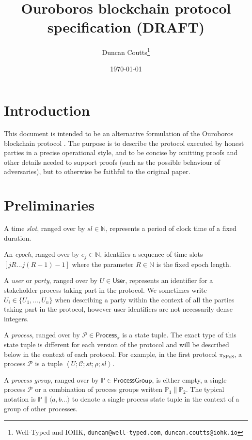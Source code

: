 \documentclass{article}
\newcommand{\sPar}{\mathrel{\parallel}}
\newcommand{\sProcess}[4]{\left\langle U ; #1 ; #2 ; #3 ; #4 \right\rangle}
\newcommand{\sChain}{\mathcal{C}}
\newcommand{\sState}{\mathit{st}}
\newcommand{\sSlot}{\mathit{sl}}
\newcommand{\sProcesses}{\mathbb{P}}
\begin{document}
\title{Ouroboros blockchain protocol specification (DRAFT)}
\author{Duncan Coutts\footnote{Well-Typed and IOHK, \texttt{duncan@well-typed.com}, \texttt{duncan.coutts@iohk.io}}}
\date{\today}

\maketitle

\section{Introduction}

This document is intended to be an alternative formulation of the Ouroboros
blockchain protocol \cite{ouroboros}. The purpose is to describe the protocol
executed by honest parties in a precise operational style, and to be concise
by omitting proofs and other details needed to support proofs (such as the
possible behaviour of adversaries), but to otherwise be faithful to the
original paper.

\section{Preliminaries}

A time \emph{slot}, ranged over by $\sSlot \in \mathbb{N}$, represents a
period of clock time of a fixed duration.

An \emph{epoch}, ranged over by $e_j \in \mathbb{N}$, identifies a sequence of
time slots $[jR \ldots j(R+1) - 1]$ where the parameter $R \in \mathbb{N}$
is the fixed epoch length.

A \emph{user} or \emph{party}, ranged over by $U \in \mathsf{User}$,
represents an identifier for a stakeholder process taking part in the
protocol. We sometimes write $U_i \in \{U_1, \ldots, U_n \}$ when describing
a party within the context of all the parties taking part in the protocol,
however user identifiers are not necessarily dense integers.

A \emph{process}, ranged over by $\mathcal{P} \in \mathsf{Process}_\pi$ is a
state tuple. The exact type of this state tuple is different for each version
of the protocol and will be described below in the context of each protocol.
For example, in the first protocol $\pi_{\text{SPoS}}$, a process
$\mathcal{P}$ is a tuple $\sProcess{\sChain}{\sState}{\rho}{\sSlot}$.

A \emph{process group}, ranged over by $\mathbb{P} \in \mathsf{ProcessGroup}$,
is either empty, a single process $\mathcal{P}$ or a combination of process
groups written $\mathbb{P}_1 \parallel \mathbb{P}_2$. The typical notation is
$\sProcesses \sPar \langle a, b ... \rangle$ to denote a single process state
tuple in the context of a group of other processes.
\end{document}
